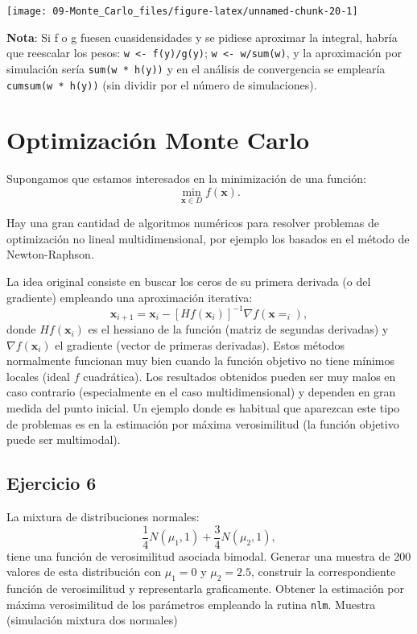 \documentclass[]{book}
\theoremstyle{definition}
\theoremstyle{definition}
\theoremstyle{definition}
\theoremstyle{remark}
\begin{document}
\begin{center}\texttt{[image: 09-Monte\_Carlo\_files/figure-latex/unnamed-chunk-20-1]} \end{center}

\textbf{Nota}: Si f o g fuesen cuasidensidades y se pidiese aproximar la
integral, habría que reescalar los pesos:
\texttt{w\ \textless{}-\ f(y)/g(y)}; \texttt{w\ \textless{}-\ w/sum(w)},
y la aproximación por simulación sería \texttt{sum(w\ *\ h(y))} y en el
análisis de convergencia se emplearía \texttt{cumsum(w\ *\ h(y))} (sin
dividir por el número de simulaciones).

\section{Optimización Monte Carlo}\label{optimizacion-monte-carlo}

Supongamos que estamos interesados en la minimización de una función:
\[\underset{\mathbf{x}\in D}{\min }f(\mathbf{x}).\]

Hay una gran cantidad de algoritmos numéricos para resolver problemas de
optimización no lineal multidimensional, por ejemplo los basados en el
método de Newton-Raphson.

La idea original consiste en buscar los ceros de su primera derivada (o
del gradiente) empleando una aproximación iterativa:
\[\mathbf{x}_{i+1} = \mathbf{x}_{i}-[Hf(\mathbf{x}_{i})]^{-1}\nabla f(\mathbf{x} = 
_{i}),\]donde \(Hf(\mathbf{x}_{i})\) es el hessiano de la función
(matriz de segundas derivadas) y \(\nabla f(\mathbf{x}_{i})\) el
gradiente (vector de primeras derivadas). Estos métodos normalmente
funcionan muy bien cuando la función objetivo no tiene mínimos locales
(ideal \(f\) cuadrática). Los resultados obtenidos pueden ser muy malos
en caso contrario (especialmente en el caso multidimensional) y dependen
en gran medida del punto inicial. Un ejemplo donde es habitual que
aparezcan este tipo de problemas es en la estimación por máxima
verosimilitud (la función objetivo puede ser multimodal).

\subsection{Ejercicio 6}\label{ejercicio-6}

La mixtura de distribuciones normales:
\[\frac{1}{4}N(\mu_{1},1)+\frac{3}{4}N(\mu_{2},1),\] tiene una función
de verosimilitud asociada bimodal. Generar una muestra de 200 valores de
esta distribución con \(\mu_{1}=0\) y \(\mu_{2}=2.5\), construir la
correspondiente función de verosimilitud y representarla graficamente.
Obtener la estimación por máxima verosimilitud de los parámetros
empleando la rutina \texttt{nlm}. Muestra (simulación mixtura dos
normales)
\end{document}
